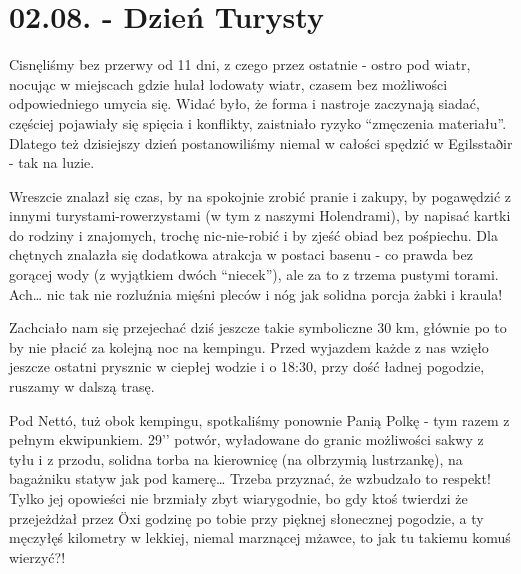 \chapter*{02.08. - Dzień Turysty}


Cisnęliśmy bez przerwy od 11 dni, z czego przez ostatnie - ostro pod wiatr, nocując w miejscach gdzie hulał lodowaty wiatr, czasem bez możliwości odpowiedniego umycia się. Widać było, że forma i nastroje zaczynają siadać, częściej pojawiały się spięcia i konflikty, zaistniało ryzyko “zmęczenia materiału”. Dlatego też dzisiejszy dzień postanowiliśmy niemal w całości spędzić w Egilsstaðir - tak na luzie.

Wreszcie znalazł się czas, by na spokojnie zrobić pranie i zakupy, by pogawędzić z innymi turystami-rowerzystami (w tym z naszymi Holendrami), by napisać kartki do rodziny i znajomych, trochę nic-nie-robić i by zjeść obiad bez pośpiechu. Dla chętnych znalazła się dodatkowa atrakcja w postaci basenu - co prawda bez gorącej wody (z wyjątkiem dwóch “niecek”), ale za to z trzema pustymi torami. Ach… nic tak nie rozluźnia mięśni pleców i nóg jak solidna porcja żabki i kraula!


Zachciało nam się przejechać dziś jeszcze takie symboliczne 30 km, głównie po to by nie płacić za kolejną noc na kempingu. Przed wyjazdem każde z nas wzięło jeszcze ostatni prysznic w ciepłej wodzie i o 18:30, przy dość ładnej pogodzie, ruszamy w dalszą trasę.

Pod Nettó, tuż obok kempingu, spotkaliśmy ponownie Panią Polkę - tym razem z pełnym ekwipunkiem. 29’’ potwór, wyładowane do granic możliwości sakwy z tyłu i z przodu, solidna torba na kierownicę (na olbrzymią lustrzankę), na bagażniku statyw jak pod kamerę… Trzeba przyznać, że wzbudzało to respekt! Tylko jej opowieści nie brzmiały zbyt wiarygodnie, bo gdy ktoś twierdzi że przejeżdżał przez Öxi godzinę po tobie przy pięknej słonecznej pogodzie, a ty męczyłęś kilometry w lekkiej, niemal marznącej mżawce, to jak tu takiemu komuś wierzyć?!


